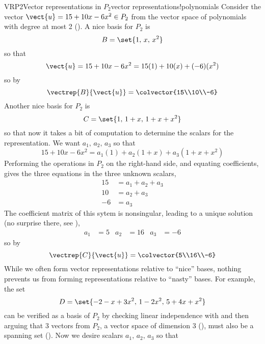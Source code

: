 \begin{example}{VRP2}{Vector representations in $P_2$}{vector representations!polynomials}
Consider the vector $\vect{u}=15+10x-6x^2\in P_2$ from the vector space of polynomials with degree at most 2 ().  A nice basis for $P_2$ is
%
\begin{equation*}
B=\set{1,\,x,\,x^2}
\end{equation*}
%
so that
%
\begin{equation*}
\vect{u}=15+10x-6x^2=15(1)+10(x)+(-6)(x^2)
\end{equation*}
%
so by 
%
\begin{equation*}
\vectrep{B}{\vect{u}}=\colvector{15\\10\\-6}
\end{equation*}
%
Another nice basis for $P_2$ is
%
\begin{equation*}
C=\set{1,\,1+x,\,1+x+x^2}
\end{equation*}
%
so that now it takes a bit of computation to determine the scalars for the representation.  We want $a_1,\,a_2,\,a_3$ so that
%
\begin{equation*}
15+10x-6x^2=a_1(1)+a_2(1+x)+a_3(1+x+x^2)
\end{equation*}
%
Performing the operations in $P_2$ on the right-hand side, and equating coefficients, gives the three equations in the three unknown scalars,
%
\begin{align*}
15&=a_1+a_2+a_3\\
10&=a_2+a_3\\
-6&=a_3
\end{align*}
%
The coefficient matrix of this sytem is nonsingular, leading to a unique solution (no surprise there, see ),
%
\begin{align*}
a_1&=5&a_2&=16&a_3&=-6
\end{align*}
%
so by 
%
\begin{equation*}
\vectrep{C}{\vect{u}}=\colvector{5\\16\\-6}
\end{equation*}
%
While we often form vector representations relative to ``nice'' bases, nothing prevents us from forming representations relative to ``nasty'' bases.  For example, the set
%
\begin{equation*}
D=\set{
-2-x+3x^2,\,
1-2x^2,\,
5+4x+x^2
}
\end{equation*}
%
can be verified as a basis of $P_2$ by checking linear independence with  and then arguing that 3 vectors from $P_2$, a vector space of dimension 3 (), must also be a spanning set ().  Now we desire scalars $a_1,\,a_2,\,a_3$ so that

\end{example}
